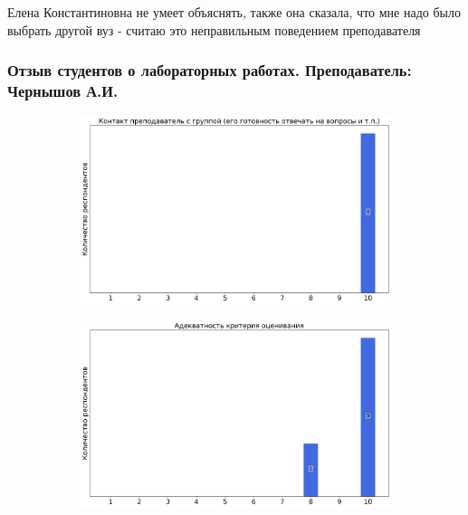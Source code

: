            \begin{commentbox} 
                Елена Константиновна не умеет объяснять, также она сказала, что мне надо было выбрать другой вуз - считаю это неправильным поведением преподавателя
            \end{commentbox}
    

    \subsubsection{Отзыв студентов о лабораторных работах. Преподаватель: Чернышов А.И.}
		\begin{figure}[H]
			\centering
			\begin{subfigure}[b]{0.45\textwidth}
				\centering
				\includegraphics[width=\textwidth]{images/1 course/Общая физика - механика/labniks-marks-Чернышов А.И.-0.png}
			\end{subfigure}
			\begin{subfigure}[b]{0.45\textwidth}
				\centering
				\includegraphics[width=\textwidth]{images/1 course/Общая физика - механика/labniks-marks-Чернышов А.И.-1.png}

\end{subfigure}
\end{figure}
